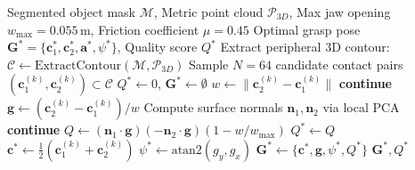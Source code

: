 \documentclass[journal]{IEEEtran}
\begin{document}
\begin{algorithm}[!t]
\caption{Affordance-Driven Antipodal Grasp Synthesis}
\label{alg_grasp_synthesis}
\begin{algorithmic}[1]
\REQUIRE Segmented object mask $\mathcal{M}$, Metric point cloud $\mathcal{P}_{3D}$, Max jaw opening $w_{\text{max}} = 0.055$\,m, Friction coefficient $\mu = 0.45$
\ENSURE Optimal grasp pose $\mathbf{G}^* = \{\mathbf{c}_1^*, \mathbf{c}_2^*, \mathbf{a}^*, \psi^*\}$, Quality score $Q^*$
\STATE Extract peripheral 3D contour: $\mathcal{C} \leftarrow \text{ExtractContour}(\mathcal{M}, \mathcal{P}_{3D})$
\STATE Sample $N = 64$ candidate contact pairs $(\mathbf{c}_1^{(k)}, \mathbf{c}_2^{(k)}) \subset \mathcal{C}$
\STATE $Q^* \leftarrow 0$, $\mathbf{G}^* \leftarrow \emptyset$
    \STATE $w \leftarrow \|\mathbf{c}_2^{(k)} - \mathbf{c}_1^{(k)}\|$
        \STATE \textbf{continue} 
    \ENDIF
    \STATE $\mathbf{g} \leftarrow (\mathbf{c}_2^{(k)} - \mathbf{c}_1^{(k)}) / w$
    \STATE Compute surface normals $\mathbf{n}_1, \mathbf{n}_2$ via local PCA
        \STATE \textbf{continue} 
    \ENDIF
    \STATE $Q \leftarrow (\mathbf{n}_1 \cdot \mathbf{g})(-\mathbf{n}_2 \cdot \mathbf{g})(1 - w/w_{\text{max}})$
        \STATE $Q^* \leftarrow Q$
        \STATE $\mathbf{c}^* \leftarrow \frac{1}{2}(\mathbf{c}_1^{(k)} + \mathbf{c}_2^{(k)})$
        \STATE $\psi^* \leftarrow \text{atan2}(g_y, g_x)$
        \STATE $\mathbf{G}^* \leftarrow \{\mathbf{c}^*, \mathbf{g}, \psi^*, Q^*\}$
    \ENDIF
\ENDFOR
\RETURN $\mathbf{G}^*, Q^*$
\end{algorithmic}
\end{algorithm}
\end{document}
